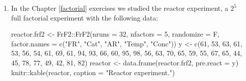 \documentclass[
]{book}
\newenvironment{Shaded}{\begin{snugshade}}{\end{snugshade}}
\newcommand{\AttributeTok}[1]{\textcolor[rgb]{0.77,0.63,0.00}{#1}}
\newcommand{\DecValTok}[1]{\textcolor[rgb]{0.00,0.00,0.81}{#1}}
\newcommand{\FunctionTok}[1]{\textcolor[rgb]{0.00,0.00,0.00}{#1}}
\newcommand{\NormalTok}[1]{#1}
\newcommand{\OtherTok}[1]{\textcolor[rgb]{0.56,0.35,0.01}{#1}}
\newcommand{\SpecialCharTok}[1]{\textcolor[rgb]{0.00,0.00,0.00}{#1}}
\newcommand{\StringTok}[1]{\textcolor[rgb]{0.31,0.60,0.02}{#1}}
\theoremstyle{definition}
\theoremstyle{definition}
\theoremstyle{definition}
\theoremstyle{definition}
\theoremstyle{remark}
\begin{document}
\begin{enumerate}
\def\labelenumi{\arabic{enumi}.}
\setcounter{enumi}{3}
\item
  In the Chapter \ref{factorial} exercises we studied the reactor experiment, a \(2^5\) full factorial experiment with the following data:

\begin{Shaded}
\begin{Highlighting}[]
\NormalTok{reactor.frf2 }\OtherTok{\textless{}{-}}\NormalTok{ FrF2}\SpecialCharTok{::}\FunctionTok{FrF2}\NormalTok{(}\AttributeTok{nruns =} \DecValTok{32}\NormalTok{, }\AttributeTok{nfactors =} \DecValTok{5}\NormalTok{, }\AttributeTok{randomize =}\NormalTok{ F,}
                           \AttributeTok{factor.names =} \FunctionTok{c}\NormalTok{(}\StringTok{"FR"}\NormalTok{, }\StringTok{"Cat"}\NormalTok{, }\StringTok{"AR"}\NormalTok{, }\StringTok{"Temp"}\NormalTok{, }\StringTok{"Conc"}\NormalTok{))}
\NormalTok{y }\OtherTok{\textless{}{-}} \FunctionTok{c}\NormalTok{(}\DecValTok{61}\NormalTok{, }\DecValTok{53}\NormalTok{, }\DecValTok{63}\NormalTok{, }\DecValTok{61}\NormalTok{, }\DecValTok{53}\NormalTok{, }\DecValTok{56}\NormalTok{, }\DecValTok{54}\NormalTok{, }\DecValTok{61}\NormalTok{, }\DecValTok{69}\NormalTok{, }\DecValTok{61}\NormalTok{, }\DecValTok{94}\NormalTok{, }\DecValTok{93}\NormalTok{, }\DecValTok{66}\NormalTok{, }\DecValTok{60}\NormalTok{, }\DecValTok{95}\NormalTok{, }\DecValTok{98}\NormalTok{, }\DecValTok{56}\NormalTok{, }\DecValTok{63}\NormalTok{,}
       \DecValTok{70}\NormalTok{, }\DecValTok{65}\NormalTok{, }\DecValTok{59}\NormalTok{, }\DecValTok{55}\NormalTok{, }\DecValTok{67}\NormalTok{, }\DecValTok{65}\NormalTok{, }\DecValTok{44}\NormalTok{, }\DecValTok{45}\NormalTok{, }\DecValTok{78}\NormalTok{, }\DecValTok{77}\NormalTok{, }\DecValTok{49}\NormalTok{, }\DecValTok{42}\NormalTok{, }\DecValTok{81}\NormalTok{, }\DecValTok{82}\NormalTok{)}
\NormalTok{reactor }\OtherTok{\textless{}{-}} \FunctionTok{data.frame}\NormalTok{(reactor.frf2, }\AttributeTok{pre.react =}\NormalTok{ y)}
\NormalTok{knitr}\SpecialCharTok{::}\FunctionTok{kable}\NormalTok{(reactor, }\AttributeTok{caption =} \StringTok{"Reactor experiment."}\NormalTok{)}
\end{Highlighting}
\end{Shaded}

  \begin{table}


\end{table}
\end{enumerate}
\end{document}
